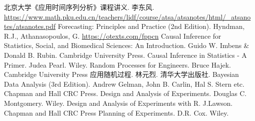 \begin{thebibliography}{99}
    北京大学《应用时间序列分析》课程讲义. 李东风. \url{https://www.math.pku.edu.cn/teachers/lidf/course/atsa/atsanotes/html/_atsanotes/atsanotes.pdf}
    Forecasting: Principles and Practice (2nd Edition). Hyndman, R.J., Athanasopoulos, G. \url{https://otexts.com/fppcn}
    Causal Inference for Statistics, Social, and Biomedical Sciences: An Introduction. Guido W. Imbens \& Donald B. Rubin. Cambridge University Press.
    Causal Inference in Statistics - A Primer. Judea Pearl. Wiley.
    Random Processes for Engineers. Bruce Hajek. Cambridge University Press
    应用随机过程. 林元烈. 清华大学出版社.
    Bayesian Data Analysis (3rd Edition). Andrew Gelman, John B. Carlin, Hal S. Stern etc. Chapman and Hall CRC Press.
    Design and Analysis of Experiments. Douglas C. Montgomery. Wiley.
    Design and Analysis of Experiments with R. J.Lawson. Chapman and Hall CRC Press
    Planning of Experiments. D.R. Cox. Wiley.


\end{thebibliography}